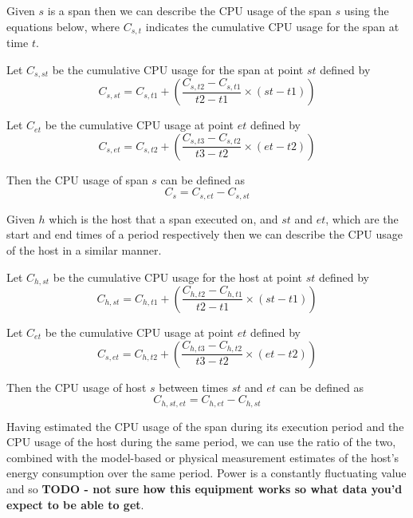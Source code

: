 Given $s$ is a span then we can describe the CPU usage of the span $s$ using the equations below, where $C_{s,t}$ indicates the cumulative CPU usage for the span at time $t$.

Let $C_{s, st}$ be the cumulative CPU usage for the span at point $st$ defined by
\begin{equation}
C_{s,st} = C_{s,t1} + ( \frac{C_{s,t2} - C_{s,t1}}{t2 - t1} \times (st - t1) ) 
\end{equation}

Let $C_{et}$ be the cumulative CPU usage at point $et$ defined by
\begin{equation}
C_{s,et} = C_{s,t2} + ( \frac{C_{s,t3} - C_{s,t2}}{t3 - t2} \times (et - t2) ) 
\end{equation}

Then the CPU usage of span $s$ can be defined as
\begin{equation}
C_{s} = C_{s,et} - C_{s,st}
\end{equation}

Given $h$ which is the host that a span executed on, and $st$ and $et$, which are the start and end times of a period respectively then we can describe the CPU usage of the host in a similar manner.

Let $C_{h, st}$ be the cumulative CPU usage for the host at point $st$ defined by
\begin{equation}
C_{h,st} = C_{h,t1} + ( \frac{C_{h,t2} - C_{h,t1}}{t2 - t1} \times (st - t1) ) 
\end{equation}

Let $C_{et}$ be the cumulative CPU usage at point $et$ defined by
\begin{equation}
C_{s,et} = C_{h,t2} + ( \frac{C_{h,t3} - C_{h,t2}}{t3 - t2} \times (et - t2) ) 
\end{equation}

Then the CPU usage of host $s$ between times $st$ and $et$ can be defined as
\begin{equation}
C_{h,st,et} = C_{h,et} - C_{h,st}
\end{equation}

Having estimated the CPU usage of the span during its execution period and the CPU usage of the host during the same period, we can use the ratio of the two, combined with the model-based or physical measurement estimates of the host's energy consumption over the same period.  Power is a constantly fluctuating value and so \textbf{TODO - not sure how this equipment works so what data you'd expect to be able to get}.

